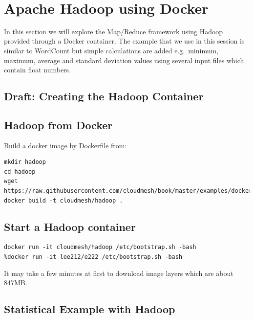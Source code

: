 
\FILENAME\

\chapter{Apache Hadoop using Docker}


In this section we will explore the 
Map/Reduce framework using Hadoop provided through a Docker
container. The example that we use in this session is similar to
WordCount but simple calculations are added e.g.\ minimum, maximum,
average and standard deviation values using several input files which
contain float numbers.

\section{Draft: Creating the Hadoop Container}

\section{Hadoop from Docker}

Build a docker image by Dockerfile from:

\begin{lstlisting}
mkdir hadoop
cd hadoop
wget https://raw.githubusercontent.com/cloudmesh/book/master/examples/docker/hadoop/Dockerfile
docker build -t cloudmesh/hadoop .
\end{lstlisting}


\section{Start a Hadoop container}

\begin{lstlisting}
docker run -it cloudmesh/hadoop /etc/bootstrap.sh -bash
%docker run -it lee212/e222 /etc/bootstrap.sh -bash
\end{lstlisting}

It may take a few minutes at first to download image layers which are
about 847MB\@.

\section{Statistical Example with Hadoop}  

